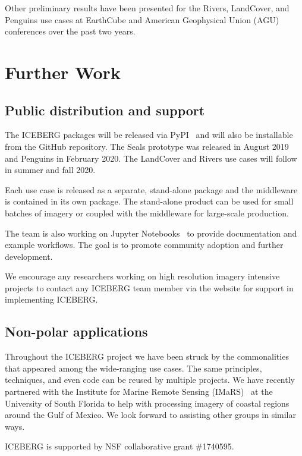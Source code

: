 \documentclass[manuscript,screen]{acmart}
\begin{document}
Other preliminary results have been presented for the Rivers, LandCover, and Penguins use cases at EarthCube and American Geophysical Union (AGU) conferences over the past two years.
\section{Further Work}
\subsection{Public distribution and support}
The ICEBERG packages will be released via PyPI~\cite{pypiweb:20} and will also be installable from the GitHub repository.  The Seals prototype was released in August 2019 and Penguins in February 2020.  The LandCover and Rivers use cases 
will follow in summer and fall 2020.

Each use case is released as a separate, stand-alone package and the 
middleware is contained in its own package.  The stand-alone product can be used for small batches of imagery or coupled with the middleware for
large-scale production.

The team is also working on Jupyter Notebooks~\cite{JNweb:20} to provide documentation and example workflows.  The goal is to promote community adoption and further development.

We encourage any researchers working on high resolution imagery intensive projects to contact any ICEBERG team member via the website for support in implementing ICEBERG. 

\subsection{Non-polar applications}
Throughout the ICEBERG project we have been struck by the commonalities that
appeared among the wide-ranging use cases.  The same principles, techniques,
and even code can be reused by multiple projects.  We have recently partnered with 
the Institute for Marine Remote Sensing (IMaRS)~\cite{imarsweb:20} at
the University of South Florida to help with processing imagery of coastal
regions around the Gulf of Mexico.  We look forward to assisting other
groups in similar ways. 
\begin{acks}
	ICEBERG is supported by NSF collaborative grant \#1740595.
\end{acks}




\end{document}
